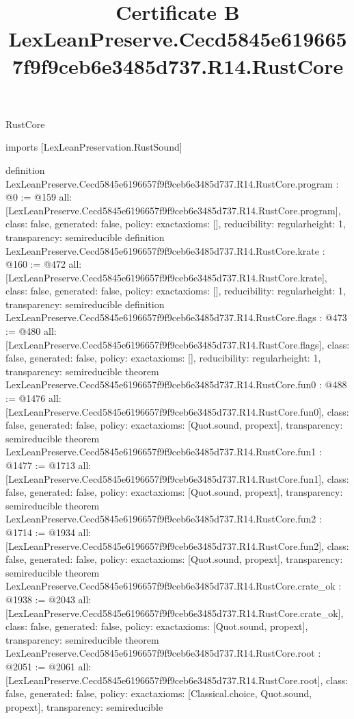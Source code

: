 \begin{lexlean}{RustCore}
\title{Certificate B LexLeanPreserve.Cecd5845e6196657f9f9ceb6e3485d737.R14.RustCore}
\begin{coremodule}
imports [LexLeanPreservation.RustSound]

definition LexLeanPreserve.Cecd5845e6196657f9f9ceb6e3485d737.R14.RustCore.program : @0 := @159 {
  all: [LexLeanPreserve.Cecd5845e6196657f9f9ceb6e3485d737.R14.RustCore.program],
  class: false,
  generated: false,
  policy: exact{axioms: []},
  reducibility: regular{height: 1},
  transparency: semireducible
}
definition LexLeanPreserve.Cecd5845e6196657f9f9ceb6e3485d737.R14.RustCore.krate : @160 := @472 {
  all: [LexLeanPreserve.Cecd5845e6196657f9f9ceb6e3485d737.R14.RustCore.krate],
  class: false,
  generated: false,
  policy: exact{axioms: []},
  reducibility: regular{height: 1},
  transparency: semireducible
}
definition LexLeanPreserve.Cecd5845e6196657f9f9ceb6e3485d737.R14.RustCore.flags : @473 := @480 {
  all: [LexLeanPreserve.Cecd5845e6196657f9f9ceb6e3485d737.R14.RustCore.flags],
  class: false,
  generated: false,
  policy: exact{axioms: []},
  reducibility: regular{height: 1},
  transparency: semireducible
}
theorem LexLeanPreserve.Cecd5845e6196657f9f9ceb6e3485d737.R14.RustCore.fun0 : @488 := @1476 {
  all: [LexLeanPreserve.Cecd5845e6196657f9f9ceb6e3485d737.R14.RustCore.fun0],
  class: false,
  generated: false,
  policy: exact{axioms: [Quot.sound, propext]},
  transparency: semireducible
}
theorem LexLeanPreserve.Cecd5845e6196657f9f9ceb6e3485d737.R14.RustCore.fun1 : @1477 := @1713 {
  all: [LexLeanPreserve.Cecd5845e6196657f9f9ceb6e3485d737.R14.RustCore.fun1],
  class: false,
  generated: false,
  policy: exact{axioms: [Quot.sound, propext]},
  transparency: semireducible
}
theorem LexLeanPreserve.Cecd5845e6196657f9f9ceb6e3485d737.R14.RustCore.fun2 : @1714 := @1934 {
  all: [LexLeanPreserve.Cecd5845e6196657f9f9ceb6e3485d737.R14.RustCore.fun2],
  class: false,
  generated: false,
  policy: exact{axioms: [Quot.sound, propext]},
  transparency: semireducible
}
theorem LexLeanPreserve.Cecd5845e6196657f9f9ceb6e3485d737.R14.RustCore.crate_ok : @1938 := @2043 {
  all: [LexLeanPreserve.Cecd5845e6196657f9f9ceb6e3485d737.R14.RustCore.crate_ok],
  class: false,
  generated: false,
  policy: exact{axioms: [Quot.sound, propext]},
  transparency: semireducible
}
theorem LexLeanPreserve.Cecd5845e6196657f9f9ceb6e3485d737.R14.RustCore.root : @2051 := @2061 {
  all: [LexLeanPreserve.Cecd5845e6196657f9f9ceb6e3485d737.R14.RustCore.root],
  class: false,
  generated: false,
  policy: exact{axioms: [Classical.choice, Quot.sound, propext]},
  transparency: semireducible
}


\end{coremodule}
\end{lexlean}
